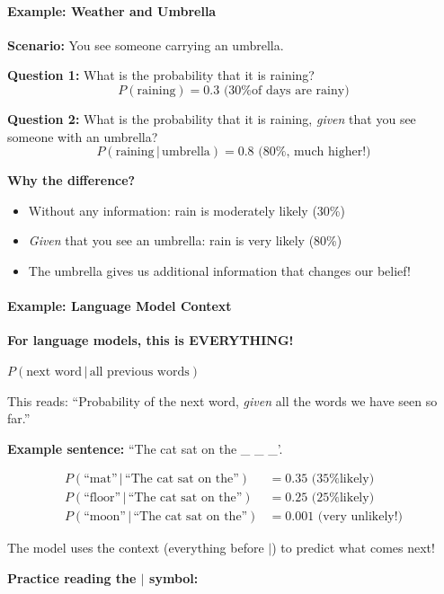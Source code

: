 \begin{chapterenv}
\paragraph{Example: Weather and Umbrella}

\textbf{Scenario:} You see someone carrying an umbrella.

\textbf{Question 1:} What is the probability that it is raining?
\[P(\text{raining}) = 0.3 \text{ (30\% of days are rainy)}\]

\textbf{Question 2:} What is the probability that it is raining, \textit{given} that you see someone with an umbrella?
\[P(\text{raining} \,|\, \text{umbrella}) = 0.8 \text{ (80\%, much higher!)}\]

\textbf{Why the difference?}
\begin{itemize}[nosep]
    \item Without any information: rain is moderately likely (30\%)
    \item \textit{Given} that you see an umbrella: rain is very likely (80\%)
    \item The umbrella gives us additional information that changes our belief!
\end{itemize}

\paragraph{Example: Language Model Context}

\textbf{For language models, this is EVERYTHING!}

$P(\text{next word} \,|\, \text{all previous words})$

This reads: ``Probability of the next word, \textit{given} all the words we have seen so far.''

\textbf{Example sentence:} ``The cat sat on the \_ \_ \_'.

\begin{align*}
P(\text{``mat''} \,|\, \text{``The cat sat on the''}) &= 0.35 \text{ (35\% likely)} \\
P(\text{``floor''} \,|\, \text{``The cat sat on the''}) &= 0.25 \text{ (25\% likely)} \\
P(\text{``moon''} \,|\, \text{``The cat sat on the''}) &= 0.001 \text{ (very unlikely!)}
\end{align*}

The model uses the context (everything before $|$) to predict what comes next!

\begin{infobox}
\textbf{Practice reading the $|$ symbol:}


\end{infobox}
\end{chapterenv}
